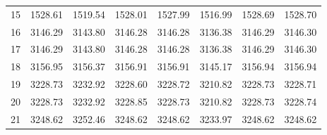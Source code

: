 \documentclass[10pt,oneside]{article}
\begin{document}
\begin{table}[h!]
\begin{tabular}{cccccccc}
15 &   1528.61 & 1519.54 & 1528.01 &    1527.99 &      1516.99 & 1528.69 &   1528.70 \\
16 &   3146.29 & 3143.80 & 3146.28 &    3146.28 &      3136.38 & 3146.29 &   3146.30 \\
17 &   3146.29 & 3143.80 & 3146.28 &    3146.28 &      3136.38 & 3146.29 &   3146.30 \\
18 &   3156.95 & 3156.37 & 3156.91 &    3156.91 &      3145.17 & 3156.94 &   3156.94 \\
19 &   3228.73 & 3232.92 & 3228.60 &    3228.72 &      3210.82 & 3228.73 &   3228.71 \\
20 &   3228.73 & 3232.92 & 3228.85 &    3228.73 &      3210.82 & 3228.73 &   3228.74 \\
21 &   3248.62 & 3252.46 & 3248.62 &    3248.62 &      3233.97 & 3248.62 &   3248.62 \\
\bottomrule
\end{tabular}
\end{table}
\end{document}
